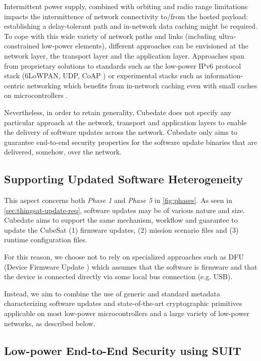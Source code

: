 Intermittent power supply, combined with orbiting and radio range limitations impacts the intermittence of network connectivity
to/from the hosted payload: establishing a delay-tolerant path and in-network data caching might be required.
To cope with this wide variety of network paths and links (including ultra-constrained low-power elements),
different approaches can be envisioned at the network layer, the transport layer and the application layer.
Approaches span from proprietary solutions to standards such as the low-power IPv6 protocol stack (6LoWPAN,
UDP, CoAP \cite{morabito2020ietf}) or experimental stacks such as information-centric networking which benefits
from in-network caching even with small caches on microcontrollers \cite{hahm2017low}.

Nevertheless, in order to retain generality, Cubedate does not specify any particular approach at the network,
transport and application layers to enable the delivery of software updates across the network. Cubedate only aims
to guarantee end-to-end security properties for the software update binaries that are delivered, somehow, over the network.

\subsection{Supporting Updated Software Heterogeneity}
This aspect concerns both \textit{Phase 1} and \textit{Phase 5} in \autoref{fig:phases}.
As seen in \autoref{sec:thingsat-update-req}, software updates may be of various nature and size.
Cubedate aims to support the same mechanism, workflow and guarantee to update the CubeSat
(1) firmware updates, (2) mission scenario files and (3) runtime configuration files.

For this reason, we choose not to rely on specialized approaches such as DFU
(Device Firmware Update \cite{beningo2018dfu}) which assumes that the software is
firmware and that the device is connected directly via some local bus connection (e.g. USB).

Instead, we aim to combine the use of generic and standard metadata characterizing software
updates and state-of-the-art cryptographic primitives applicable on most low-power
microcontrollers and a large variety of low-power networks, as described below.

\subsection{Low-power End-to-End Security using SUIT}

